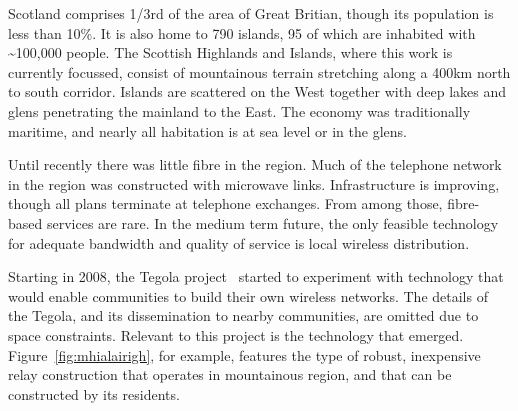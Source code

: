 
Scotland comprises 1/3rd of the area of Great Britian, though its population is
less than 10\%. It is also home to 790 islands, 95 of which are inhabited with
\textasciitilde 100,000 people. The Scottish Highlands and Islands, where this
work is currently focussed, consist of mountainous terrain stretching along a
400km north to south corridor. Islands are scattered on the West together with
deep lakes and glens penetrating the mainland to the East.  The economy was
traditionally maritime, and nearly all habitation is at sea level or in the
glens.

Until recently there was little fibre in the region.  Much of the telephone
network in the region was constructed with microwave links. Infrastructure is
improving, though all plans terminate at telephone exchanges. From among those,
fibre-based services are rare. In the medium term future, the only feasible
technology for adequate bandwidth and quality of service is local wireless
distribution.

Starting in 2008, the Tegola project~\cite{tegola} started to
experiment with technology that would enable communities to build
their own wireless networks.
The details of the Tegola, and its dissemination to nearby communities, are
omitted due to space constraints. Relevant to this project is the technology
that emerged. Figure~\ref{fig:mhialairigh}, for example, features the type of
robust, inexpensive relay construction that operates in mountainous region, and
that can be constructed by its residents.

